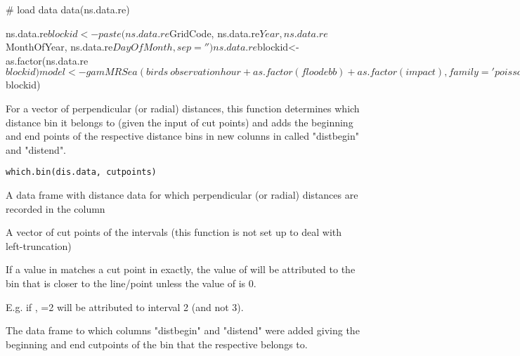 \documentclass[a4paper]{book}
\begin{document}
%
\begin{Examples}
\begin{ExampleCode}
# load data
data(ns.data.re)

ns.data.re$blockid<-paste(ns.data.re$GridCode, ns.data.re$Year, ns.data.re$MonthOfYear, 
                     ns.data.re$DayOfMonth, sep='')
ns.data.re$blockid<-as.factor(ns.data.re$blockid)
model<-gamMRSea(birds ~ observationhour + as.factor(floodebb) + as.factor(impact),  
              family='poisson', data=ns.data.re)

timeInfluenceCheck(model, ns.data.re$blockid)

\end{ExampleCode}
\end{Examples}
%
\begin{Description}\relax
For a vector of perpendicular (or radial) distances, this function determines which distance bin it belongs to 
(given the input of cut points) and adds the beginning and end points of the respective distance bins in new colunns
in  called "distbegin" and "distend".
\end{Description}
%
\begin{Usage}
\begin{verbatim}
which.bin(dis.data, cutpoints)
\end{verbatim}
\end{Usage}
%
\begin{Arguments}
\begin{ldescription}
\item[\code{dis.data}] A data frame with distance data for which perpendicular (or radial) distances are recorded in the  column

\item[\code{cutpoints}] A vector of cut points of the intervals (this function is not set up to deal with left-truncation)
\end{ldescription}
\end{Arguments}
%
\begin{Details}\relax
If a value in  matches a cut point in  exactly,  the value of  will be attributed to the bin that is closer to the line/point unless the value of  is 0. 

E.g. if , =2 will be attributed to interval 2 (and not 3).
\end{Details}
%
\begin{Value}
The  data frame to which columns "distbegin" and "distend" were added giving the beginning and end cutpoints 
of the bin that the respective  belongs to.
\end{Value}
\printindex{}
\end{document}
